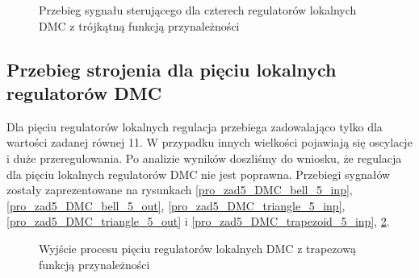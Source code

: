 \begin{figure}[b]
    \centering
    \caption{Przebieg sygnału sterującego dla czterech regulatorów lokalnych DMC z trójkątną  funkcją przynależności}
    \label{pro_zad5_DMC_triangle_4_inp}
\end{figure}
\FloatBarrier

\subsection{Przebieg strojenia dla pięciu lokalnych regulatorów DMC}
Dla pięciu regulatorów lokalnych regulacja przebiega zadowalająco tylko dla wartości zadanej równej 11. W przypadku innych wielkości pojawiają się oscylacje i duże przeregulowania. Po analizie wyników doszliśmy do wniosku, że regulacja dla pięciu lokalnych regulatorów DMC nie jest poprawna. Przebiegi sygnałów zostały zaprezentowane na rysunkach \ref{pro_zad5_DMC_bell_5_inp}, \ref{pro_zad5_DMC_bell_5_out}, \ref{pro_zad5_DMC_triangle_5_inp}, \ref{pro_zad5_DMC_triangle_5_out} i \ref{pro_zad5_DMC_trapezoid_5_inp}, \ref{pro_zad5_DMC_trapezoid_5_out}.
\begin{figure}[t]
    \centering
    \caption{Wyjście procesu pięciu regulatorów lokalnych DMC z trapezową funkcją przynależności}
    \label{pro_zad5_DMC_trapezoid_5_out}
\end{figure}

